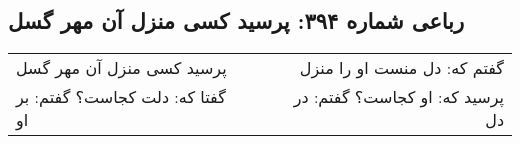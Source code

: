 \begin{center}
\section*{رباعی شماره ۳۹۴: پرسید کسی منزل آن مهر گسل}
\label{sec:sh394}
\begin{longtable}{l p{0.5cm} r}
پرسید کسی منزل آن مهر گسل
&&
گفتم که: دل منست او را منزل
\\
گفتا که: دلت کجاست؟ گفتم: بر او
&&
پرسید که: او کجاست؟ گفتم: در دل
\\
\end{longtable}
\end{center}
